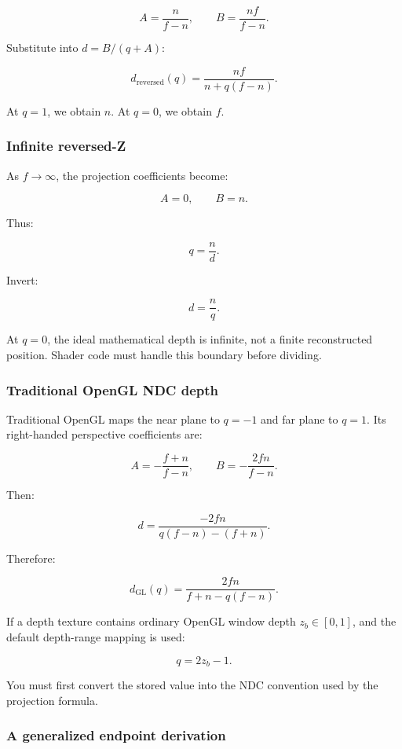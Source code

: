 \[ A=\frac n{f-n}, \qquad B=\frac{nf}{f-n}. \]

Substitute into \(d=B/(q+A)\):

\[ \boxed{ d_{\mathrm{reversed}}(q) = \frac{nf}{n+q(f-n)}. } \]

At \(q=1\), we obtain \(n\). At \(q=0\), we obtain \(f\).

\subsubsection{Infinite reversed-Z}\label{infinite-reversed-z}

As \(f\to\infty\), the projection coefficients become:

\[ A=0,\qquad B=n. \]

Thus:

\[ q=\frac nd. \]

Invert:

\[ \boxed{ d=\frac nq. } \]

At \(q=0\), the ideal mathematical depth is infinite, not a finite reconstructed position. Shader code must handle this boundary before dividing.

\subsubsection{Traditional OpenGL NDC depth}\label{traditional-opengl-ndc-depth}

Traditional OpenGL maps the near plane to \(q=-1\) and far plane to \(q=1\). Its right-handed perspective coefficients are:

\[ A=-\frac{f+n}{f-n}, \qquad B=-\frac{2fn}{f-n}. \]

Then:

\[ d= \frac{-2fn} {q(f-n)-(f+n)}. \]

Therefore:

\[ \boxed{ d_{\mathrm{GL}}(q)= \frac{2fn}{f+n-q(f-n)}. } \]

If a depth texture contains ordinary OpenGL window depth \(z_b\in[0,1]\), and the default depth-range mapping is used:

\[ q=2z_b-1. \]

You must first convert the stored value into the NDC convention used by the projection formula.

\subsubsection{A generalized endpoint derivation}\label{a-generalized-endpoint-derivation}

